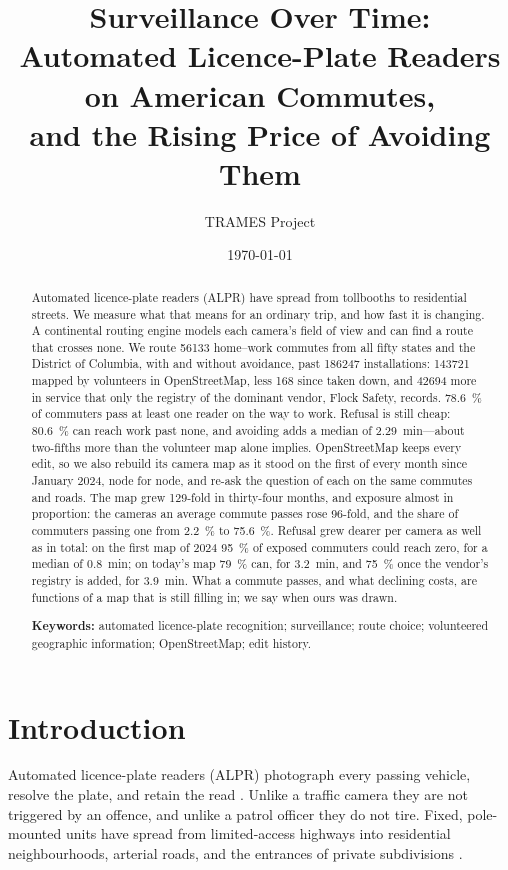 \documentclass[11pt,twoside]{article}
\title{\bfseries Surveillance Over Time:\\[2pt]
\large Automated Licence-Plate Readers on American Commutes,\\
and the Rising Price of Avoiding Them}
\author[ ]{TRAMES Project}
\affil[ ]{\small\texttt{kara@soulstone.org}}
\date{\today}
\newcommand{\alpr}{ALPR\xspace}
\begin{document}
\maketitle

\begin{abstract}
\noindent
Automated licence-plate readers (\alpr) have spread from tollbooths to residential streets. We
measure what that means for an ordinary trip, and how fast it is changing. A continental
routing engine models each camera's field of view and can find a route that crosses none. We
route \num{56133} home--work commutes from all fifty states and the District of Columbia, with
and without avoidance, past \num{186247} installations: \num{143721} mapped by volunteers in
OpenStreetMap, less 168 since taken down, and \num{42694} more in service that only the registry
of the dominant vendor, Flock Safety, records. \SI{78.6}{\percent} of commuters pass at least
one reader on the way to work. Refusal is still cheap: \SI{80.6}{\percent} can reach work past
none, and avoiding adds a median of
\SI{2.29}{\minute}---about two-fifths more than the volunteer map alone implies. OpenStreetMap
keeps every edit, so we also rebuild its camera map as it stood on the first of every month
since January 2024, node for node, and re-ask the question of each on the same commutes and
roads. The map grew 129-fold in thirty-four months, and exposure almost in proportion: the
cameras an average commute passes rose 96-fold, and the share of commuters passing one from
\SI{2.2}{\percent} to \SI{75.6}{\percent}. Refusal grew dearer per camera as well as in
total: on the first map of 2024 \SI{95}{\percent} of exposed commuters could reach zero, for a
median of \SI{0.8}{\minute}; on today's map \SI{79}{\percent}
can, for \SI{3.2}{\minute}, and \SI{75}{\percent} once the vendor's registry is added, for
\SI{3.9}{\minute}. What a commute passes, and what declining costs, are functions of a map that
is still filling in; we say when ours was drawn.

\smallskip\noindent\textbf{Keywords:} automated licence-plate recognition; surveillance;
route choice; volunteered geographic information; OpenStreetMap; edit history.
\end{abstract}

\section{Introduction}
\label{sec:intro}

Automated licence-plate readers (\alpr) photograph every passing vehicle, resolve the plate,
and retain the read \citep{finklea2024}. Unlike a traffic camera they are not triggered by an offence, and unlike
a patrol officer they do not tire. Fixed, pole-mounted units have spread from limited-access
highways into residential neighbourhoods, arterial roads, and the entrances of private
subdivisions \citep{lum2019,stanley2022}.
\end{document}
